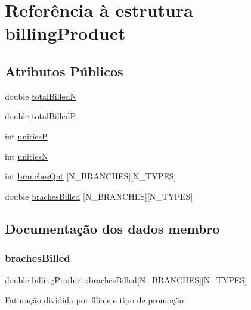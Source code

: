 \hypertarget{structbillingProduct}{}\section{Referência à estrutura billing\+Product}
\label{structbillingProduct}
\subsection*{Atributos Públicos}
\begin{DoxyCompactItemize}
\item 
double \hyperlink{structbillingProduct_acb86d5aba398d1b834ee2adfc957f6cb}{total\+BilledN}
\item 
double \hyperlink{structbillingProduct_af5cc9c4ecd38c9d8fb97a2bc0be7eeb9}{total\+BilledP}
\item 
int \hyperlink{structbillingProduct_ac75726314819281a39887d12ace96476}{unitiesP}
\item 
int \hyperlink{structbillingProduct_aab2111c1f700bf508b4c691859d17eea}{unitiesN}
\item 
int \hyperlink{structbillingProduct_a41308466e945caff3f4f409a14d71ca8}{branches\+Qnt} \mbox{[}N\+\_\+\+B\+R\+A\+N\+C\+H\+ES\mbox{]}\mbox{[}N\+\_\+\+T\+Y\+P\+ES\mbox{]}
\item 
double \hyperlink{structbillingProduct_a7edfdc699488f53eb88f404cc5468491}{braches\+Billed} \mbox{[}N\+\_\+\+B\+R\+A\+N\+C\+H\+ES\mbox{]}\mbox{[}N\+\_\+\+T\+Y\+P\+ES\mbox{]}
\end{DoxyCompactItemize}


\subsection{Documentação dos dados membro}
\mbox{\label{structbillingProduct_a7edfdc699488f53eb88f404cc5468491}} 
\subsubsection{\texorpdfstring{braches\+Billed}{brachesBilled}}
{\footnotesize\ttfamily double billing\+Product\+::braches\+Billed\mbox{[}N\+\_\+\+B\+R\+A\+N\+C\+H\+ES\mbox{]}\mbox{[}N\+\_\+\+T\+Y\+P\+ES\mbox{]}}

Faturação dividida por filiais e tipo de promoção \mbox{\label{structbillingProduct_a41308466e945caff3f4f409a14d71ca8}} 

